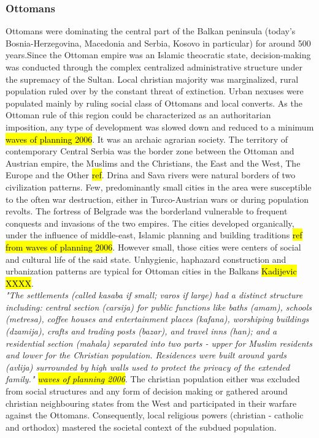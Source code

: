 \documentclass[11pt]{report}
\begin{document}
\subsubsection{Ottomans}
Ottomans were dominating the central part of the Balkan peninsula (today’s Bosnia-Herzegovina,  Macedonia  and  Serbia,  Kosovo  in  particular) for around 500 years.\footnotemark Since the Ottoman empire was an Islamic theocratic state, decision-making was conducted through the complex centralized administrative structure under the supremacy of the Sultan. Local christian majority was marginalized, rural population ruled over by the constant threat of extinction. Urban nexuses were populated mainly by ruling social class of Ottomans and local converts. As the Ottoman rule of this region could be characterized as an authoritarian imposition, any type of development was slowed down and reduced to a minimum \hl{waves of planning 2006}. It was an archaic agrarian society. The territory of contemporary Central Serbia was the border zone between the Ottoman and Austrian empire, the Muslims and the Christians, the East and the West, The Europe and the Other \hl{ref}. Drina and Sava rivers were natural borders of two civilization patterns. Few, predominantly small cities in the area were susceptible to the often war destruction, either in Turco-Austrian wars or during population revolts. The fortress of Belgrade was the borderland vulnerable to frequent conquests and invasions of the two empires. The cities developed organically, under the influence of middle-east, Islamic planning and building traditions \hl{ref from waves of planning 2006}. However small, those cities were centers of social and cultural life of the said state. Unhygienic, haphazard construction and urbanization patterns are typical for Ottoman cities in the Balkans \hl{Kadijevic XXXX}. 
\\ 
\textit{"The settlements (called kasaba  if  small;  varos  if  large)  had  a  distinct  structure  including:  central section (carsija) for public functions like baths (amam), schools (metresa), coffee houses and entertainment  places  (kafana),  worshiping  buildings  (dzamija),  crafts  and  trading  posts (bazar), and travel inns (han); and a residential section (mahala) separated into two parts - upper for Muslim residents and lower for the Christian population. Residences were built around yards (avlija) surrounded by high walls used to protect the privacy of the extended family." \hl{waves of planning 2006}}. The christian population either was excluded from social structures and any form of decision making or gathered around christian neighbouring states from the West and participated in their warfare against the Ottomans. Consequently, local religious powers (christian - catholic and orthodox) mastered the societal context of the subdued population.
\end{document}
